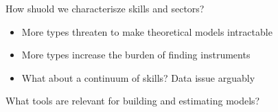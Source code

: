 \documentclass[10pt, final]{article}
\begin{document}
How shuold we characterisze skills and sectors?
\begin{itemize}
    \item More types threaten to make theoretical models intractable
    \item More types increase the burden of finding instruments
    \item What about a continuum of skills? Data issue arguably
\end{itemize}

What tools are relevant for building and estimating models?


\fi
\end{document}
